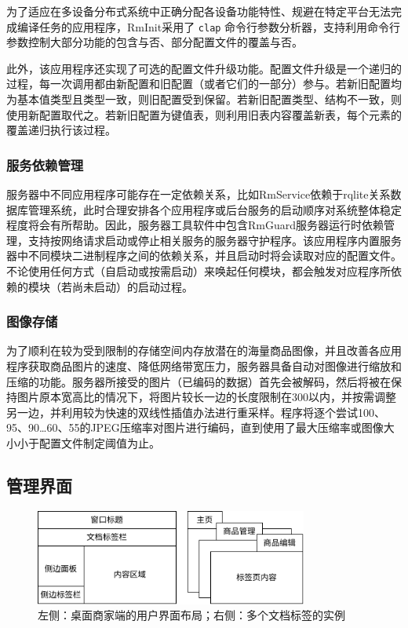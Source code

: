 为了适应在多设备分布式系统中正确分配各设备功能特性、规避在特定平台无法完成编译任务的应用程序，RmInit采用了 \verb|clap| 命令行参数分析器，支持利用命令行参数控制大部分功能的包含与否、部分配置文件的覆盖与否。

此外，该应用程序还实现了可选的配置文件升级功能。配置文件升级是一个递归的过程，每一次调用都由新配置和旧配置（或者它们的一部分）参与。若新旧配置均为基本值类型且类型一致，则旧配置受到保留。若新旧配置类型、结构不一致，则使用新配置取代之。若新旧配置为键值表，则利用旧表内容覆盖新表，每个元素的覆盖递归执行该过程。

\subsubsection{服务依赖管理}
服务器中不同应用程序可能存在一定依赖关系，比如RmService依赖于rqlite关系数据库管理系统，此时合理安排各个应用程序或后台服务的启动顺序对系统整体稳定程度将会有所帮助。因此，服务器工具软件中包含RmGuard服务器运行时依赖管理，支持按网络请求启动或停止相关服务的服务器守护程序。该应用程序内置服务器中不同模块二进制程序之间的依赖关系，并且启动时将会读取对应的配置文件。不论使用任何方式（自启动或按需启动）来唤起任何模块，都会触发对应程序所依赖的模块（若尚未启动）的启动过程。

\subsubsection{图像存储}
为了顺利在较为受到限制的存储空间内存放潜在的海量商品图像，并且改善各应用程序获取商品图片的速度、降低网络带宽压力，服务器具备自动对图像进行缩放和压缩的功能。服务器所接受的图片（已编码的数据）首先会被解码，然后将被在保持图片原本宽高比的情况下，将图片较长一边的长度限制在300以内，并按需调整另一边，并利用较为快速的双线性插值办法进行重采样。程序将逐个尝试100、95、90\ldots60、55的JPEG压缩率对图片进行编码，直到使用了最大压缩率或图像大小小于配置文件制定阈值为止。

\subsection{管理界面}

\begin{figure}[htbp]
	\centering
	\includegraphics[width=0.8\textwidth]{./imgs/rma-design-layout.png}
	\caption{左侧：桌面商家端的用户界面布局；右侧：多个文档标签的实例}
	\label{fig:rma-design-layout}
\end{figure}

